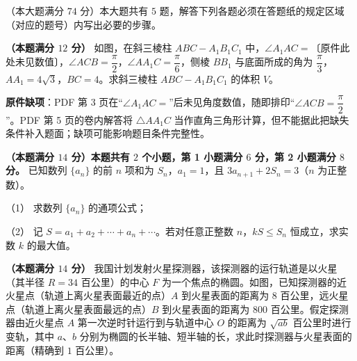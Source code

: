 （本大题满分 $74$ 分）本大题共有 $5$ 题，解答下列各题必须在答题纸的规定区域（对应的题号）内写出必要的步骤。

\Needspace{0.4\textheight}
\begin{question}
\textbf{（本题满分 $12$ 分）} 如图，在斜三棱柱 $ABC-A_1B_1C_1$ 中，$\angle A_1AC=$〔原件此处未见数值〕，$\angle ACB=\dfrac{\pi}{2}$，$\angle AA_1C=\dfrac{\pi}{6}$，侧棱 $BB_1$ 与底面所成的角为 $\dfrac{\pi}{3}$，$AA_1=4\sqrt3$，$BC=4$。求斜三棱柱 $ABC-A_1B_1C_1$ 的体积 $V$。
\nopagebreak[4]
\begin{center}\end{center}
\nopagebreak[4]
\begin{gktip}
\textbf{原件缺项}：PDF 第 3 页在“$\angle A_1AC=$”后未见角度数值，随即排印“$\angle ACB=\dfrac{\pi}{2}$”。PDF 第 5 页的卷内解答将 $\triangle AA_1C$ 当作直角三角形计算，但不能据此把缺失条件补入题面；缺项可能影响题目条件完整性。
\end{gktip}

\end{question}
\begin{question}
\textbf{（本题满分 $14$ 分）本题共有 $2$ 个小题，第 1 小题满分 $6$ 分，第 2 小题满分 $8$ 分。} 已知数列 $\{a_n\}$ 的前 $n$ 项和为 $S_n$，$a_1=1$，且 $3a_{n+1}+2S_n=3$（$n$ 为正整数）。

（1） 求数列 $\{a_n\}$ 的通项公式；

（2） 记 $S=a_1+a_2+\cdots+a_n+\cdots$。若对任意正整数 $n$，$kS\le S_n$ 恒成立，求实数 $k$ 的最大值。

\Needspace{0.4\textheight}
\end{question}
\begin{question}
\textbf{（本题满分 $14$ 分）} 我国计划发射火星探测器，该探测器的运行轨道是以火星（其半径 $R=34$ 百公里）的中心 $F$ 为一个焦点的椭圆。如图，已知探测器的近火星点（轨道上离火星表面最近的点）$A$ 到火星表面的距离为 $8$ 百公里，远火星点（轨道上离火星表面最远的点）$B$ 到火星表面的距离为 $800$ 百公里。假定探测器由近火星点 $A$ 第一次逆时针运行到与轨道中心 $O$ 的距离为 $\sqrt{ab}$ 百公里时进行变轨，其中 $a$、$b$ 分别为椭圆的长半轴、短半轴的长，求此时探测器与火星表面的距离（精确到 $1$ 百公里）。
\nopagebreak[4]
\begin{center}\end{center}
\nopagebreak[4]
\Needspace{0.4\textheight}
\end{question}
